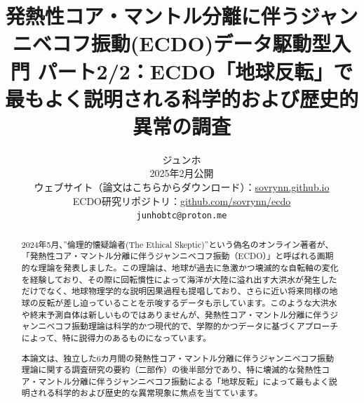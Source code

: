 \documentclass[10pt,twocolumn,letterpaper]{article}
\begin{document}
\title{発熱性コア・マントル分離に伴うジャンニベコフ振動(ECDO)データ駆動型入門 パート2/2：ECDO「地球反転」で最もよく説明される科学的および歴史的異常の調査}

\author{ジュンホ\\
2025年2月公開\\
ウェブサイト（論文はこちらからダウンロード）：\href{https://sovrynn.github.io}{sovrynn.github.io}\\
ECDO研究リポジトリ：\href{https://github.com/sovrynn/ecdo}{github.com/sovrynn/ecdo}\\
{\tt\small junhobtc@proton.me}
}

\maketitle

\begin{abstract}
2024年5月、”倫理的懐疑論者(The Ethical Skeptic)”という偽名のオンライン著者\cite{0}が、「発熱性コア・マントル分離に伴うジャンニベコフ振動（ECDO）」\cite{1}と呼ばれる画期的な理論を発表しました。この理論は、地球が過去に急激かつ壊滅的な自転軸の変化を経験しており、その際に回転慣性によって海洋が大陸に溢れ出す大洪水が発生しただけでなく、地球物理学的な説明因果過程も提唱しており、さらに近い将来同様の地球の反転が差し迫っていることを示唆するデータも示しています。このような大洪水や終末予測自体は新しいものではありませんが、発熱性コア・マントル分離に伴うジャンニベコフ振動理論は科学的かつ現代的で、学際的かつデータに基づくアプローチによって、特に説得力のあるものになっています。

本論文は、独立した6カ月間の発熱性コア・マントル分離に伴うジャンニベコフ振動理論に関する調査研究\cite{2,20}の要約（二部作）の後半部分であり、特に壊滅的な発熱性コア・マントル分離に伴うジャンニベコフ振動による「地球反転」によって最もよく説明される科学的および歴史的な異常現象に焦点を当てています。
\end{abstract}

\end{document}
